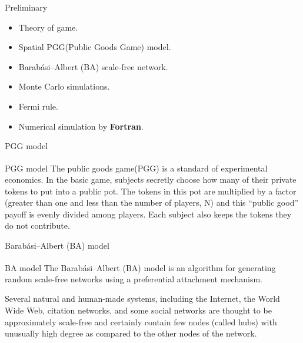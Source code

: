 \documentclass[notheorems,11pt,compress]{beamer}
\numberwithin{figure}{section}
\numberwithin{table}{section}
\numberwithin{equation}{section}
\theoremstyle{plain}
\numberwithin{theorem}{section}
\numberwithin{definition}{section}
\numberwithin{lemma}{section}
\numberwithin{proposition}{section}
\numberwithin{corollary}{section}
\theoremstyle{example}
\newcommand{\upcite}[1]{\textsuperscript{\cite{#1}}}
\begin{document}
\begin{frame}{Preliminary}

	\begin{alertblock}{}
		\begin{itemize}
			\item Theory of game.
			\item Spatial PGG(Public Goods Game) model.
			\item Barabási–Albert (BA) scale-free network.
			\item Monte Carlo simulations.
			\item Fermi rule.
			\item Numerical simulation by \textbf{Fortran}.
		\end{itemize}
	\end{alertblock}
\end{frame}


\begin{frame}{PGG model}
	\begin{block}{PGG model}
		The public goods game(PGG)\upcite{wiki:pgg} is a standard of experimental economics.
		In the basic game, subjects secretly choose how many of their private tokens to put into a public pot.
		The tokens in this pot are multiplied by a factor (greater than one and less than the number of players, N) and this ``public good'' payoff is evenly divided among players.
		Each subject also keeps the tokens they do not contribute.
	\end{block}
	\vspace*{2em}

\end{frame}


\begin{frame}{Barabási–Albert (BA) model}
	\begin{block}{BA model}
		The Barabási–Albert (BA)\upcite{wiki:ba} model is an algorithm for generating random scale-free networks using a preferential attachment mechanism.

		Several natural and human-made systems, including the Internet, the World Wide Web, citation networks, and some social networks are thought to be approximately scale-free and certainly contain few nodes (called hubs) with unusually high degree as compared to the other nodes of the network.
	\end{block}
	\vspace*{2em}

\end{frame}
\end{document}
